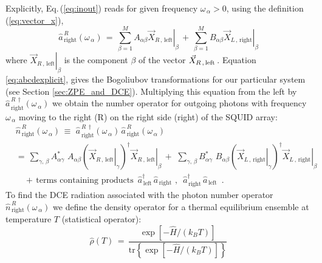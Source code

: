 Explicitly, Eq.\,(\ref{eq:inout}) reads for given frequency $\omega_{\,\alpha} > 0$, 
using the definition (\ref{eq:vector_x}),
%
\begin{equation} \label{eq:abcdexplicit}
\hat{a}_{\,\text{right}}^{\,R}(\omega_{\,\alpha}) \, = \, 
\sum_{\beta=1}^M A_{\alpha \beta}  \left. \vec{X}_{R\,,\,\text{left}} \right|_{\beta} \, + \,
\sum_{\beta=1}^M B_{\alpha \beta}  \left. \vec{X}_{L\,,\,\text{right}} \right|_{\beta}
\end{equation}
%
where $\displaystyle{\left. \vec{X}_{R\,,\,\text{left}} \right|_{\beta}}$ is the 
component $\beta$ of the vector $\displaystyle{\vec{X}_{R\,,\,\text{left\,}}}$. Equation \ref{eq:abcdexplicit}, gives the Bogoliubov transformations for our particular system (see Section \ref{sec:ZPE_and_DCE}).
Multiplying this equation from the left by $\hat{a}_{\,\text{right}}^{\,R\,\dagger}(\omega_{\,\alpha})$
we obtain the number operator for outgoing photons with frequency $\omega_{\,\alpha}$ 
moving to the right (R) on the right side (right) of the SQUID array:
%
\begin{equation} \label{eq:numberop} 
\begin{split}
& \hat{n}_{\,\text{right}}^{\,R}(\omega_{\,\alpha}) \, \equiv \, \, 
\hat{a}_{\,\text{right}}^{\,R\,\dagger}(\omega_{\,\alpha}) \, 
\hat{a}_{\,\text{right}}^{\,R}(\omega_{\,\alpha}) \\[3mm]
& = \, \sum\limits_{\gamma, \, \beta} A_{\alpha \gamma}^* \, \, A_{\alpha \beta}  
\left( \left. \vec{X}_{R\,,\,\text{left}} \right|_{\gamma} \right)^{\dagger}
\left. \vec{X}_{R\,,\,\text{left}} \right|_{\beta} \, + \,
\, \sum\limits_{\gamma, \, \beta} B_{\alpha \gamma}^* \, \, B_{\alpha \beta}  
\left( \left. \vec{X}_{L\,,\,\text{right}} \right|_{\gamma} \right)^{\dagger}
\left. \vec{X}_{L\,,\,\text{right}} \right|_{\beta} \\[3mm]
& \quad + \, \text{terms containing products} \, \, \, 
\hat{a}_{\,\text{left}}^{\dagger} \, \hat{a}_{\,\text{right}} \, \, , \, \, \, 
\hat{a}_{\,\text{right}}^{\dagger} \, \hat{a}_{\,\text{left}}
\, \, \, .
\end{split}
\end{equation}
%
\newpage
To find the DCE radiation associated with the photon number operator 
$\hat{n}_{\,\text{right}}^{\,R}(\omega_{\,\alpha})$ 
we define the density operator for a thermal equilibrium ensemble at temperature $T$
(statistical operator):
%
\begin{equation} \label{eq:do}
\hat{\rho}(T) \, = \, \frac{\exp\left[ - \hat{H} / (k_B T) \right]}{  \text{tr} \left\{ \exp\left[ - \hat{H} / (k_B T) \right] \right\}}
\end{equation}
